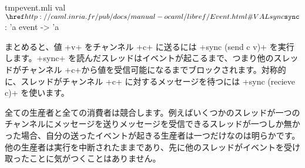%
\begin{listingcodefile}{tmpevent.mli}
val $\indexlibvalue{Event}{sync}$ : 'a event -> 'a
\end{listingcodefile}
%
まとめると、値 \ml+v+ をチャンネル \ml+c+ に送るには \ml+sync (send c v)+ を実行します。\ml+sync+ を読んだスレッドはイベントが起こるまで、つまり他のスレッドがチャンネル \ml+c+から値を受信可能になるまでブロックされます。対称的に、スレッドがチャンネル \ml+c+ に対するメッセージを待つには \ml+sync (recieve c)+ を使います。

全ての生産者と全ての消費者は競合します。例えばいくつかのスレッドが一つのチャンネルにメッセージを送りメッセージを受信できるスレッドが一つしか無かった場合、自分の送ったイベントが起きる生産者は一つだけなのは明らかです。他の生産者は実行を中断されたままであり、先に他のスレッドがイベントを受け取ったことに気がつくことはありません。

